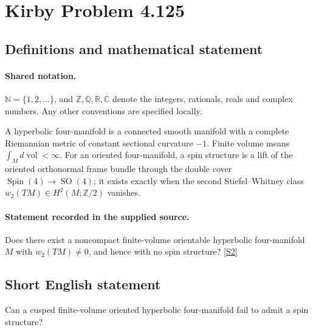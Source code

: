 \documentclass[11pt]{article}
\newcommand{\sref}[2]{\hyperlink{source:#1:#2}{[S#2]}}
\begin{document}
\section{Kirby Problem 4.125}\label{statement}

\subsection{Definitions and mathematical statement}

\paragraph{Shared notation.}$\mathbb N=\{1,2,\ldots\}$, and $\mathbb Z,\mathbb Q,\mathbb R,\mathbb C$ denote the integers, rationals, reals and complex numbers. Any other conventions are specified locally.


A hyperbolic four-manifold is a connected smooth manifold with a complete Riemannian metric of constant sectional curvature $-1$. Finite volume means $\int_M d\operatorname{vol}<\infty$. For an oriented four-manifold, a spin structure is a lift of the oriented orthonormal frame bundle through the double cover $\operatorname{Spin}(4)\to\operatorname{SO}(4)$; it exists exactly when the second Stiefel--Whitney class $w_2(TM)\in H^2(M;\mathbb Z/2)$ vanishes.
\paragraph{Statement recorded in the supplied source.}
Does there exist a noncompact finite-volume orientable hyperbolic four-manifold $M$ with $w_2(TM)\ne0$, and hence with no spin structure? \sref{statement}{2}
\subsection{Short English statement}
Can a cusped finite-volume oriented hyperbolic four-manifold fail to admit a spin structure?
\end{document}

